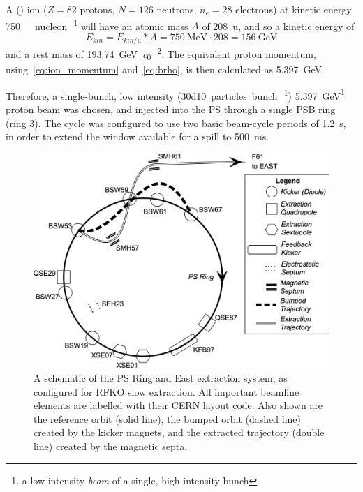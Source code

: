 \documentclass[a4paper,twoside,11pt]{report}
\begin{document}
A () ion ($Z=82$ protons, $N=126$ neutrons, $n_e=28$ electrons) at kinetic energy \qty[per-mode=symbol]{750}{\mega\eVperc\per nucleon} will have an atomic mass $A$ of \qty{208}{\atomicmassunit}, and so a kinetic energy of 
\begin{equation}
  E_{kin}=E_{kin/u}*A=\qty{750}{\mega\electronvolt}\cdot 208=\qty{156}{\giga\electronvolt}
\end{equation}
and a rest mass of \qty{193.74}{\giga\electronvolt\per\clight\squared}. The equivalent proton momentum, using~\autoref{eq:ion_momentum} and~\autoref{eq:brho}, is then calculated as \qty{5.397}{\giga\electronvolt}. 

Therefore, a single-bunch, low intensity (\qty[per-mode=symbol]{30d10}{particles\per bunch}) \qty{5.397}{\giga\electronvolt}\footnote{a low intensity \textit{beam} of a single, high-intensity bunch} proton beam was chosen, and injected into the PS through a single PSB ring (ring 3). The cycle was configured to use two basic beam-cycle periods of \qty{1.2}{\second}, in order to extend the window available for a spill to \qty{500}{\milli\second}.

\begin{figure}
  \centering
  \includegraphics*[width=\linewidth]{ps-sx-system.png}
  \caption[Schematic of the PS Ring and East extraction system configured for RFKO slow extraction]{A schematic of the PS Ring and East extraction system, as configured for RFKO slow extraction. All important beamline elements are labelled with their CERN layout code. Also shown are the reference orbit (solid line), the bumped orbit (dashed line) created by the kicker magnets, and the extracted trajectory (double line) created by the magnetic septa.}\label{fig:schematic}
\end{figure}
\end{document}
